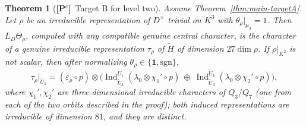 \documentclass[11pt]{article}
\newcommand{\Ind}{\operatorname{Ind}}
\newcommand{\tH}{\widetilde H}
\newcommand{\tU}{\widetilde U}
\newcommand{\Pctag}{\textnormal{\textbf{[P$^{\mathrm c}$]}}}
\theoremstyle{plain}
\newtheorem{theorem}{Theorem}[section]
\theoremstyle{definition}
\begin{document}
\begin{theorem}[\Pctag\ Target B for level two]\label{thm:leveltwo}
Assume Theorem~\ref{thm:main-targetA}.  Let $\rho$ be an irreducible
representation of $D^\times$ trivial on $K^3$ with $\theta_\rho|_{\mu_3}=1$.  Then $L_D\Theta_\rho$, computed
with any compatible genuine central character, is the character of a
genuine irreducible representation $\tau_\rho$ of $\tH$ of dimension
$27\dim\rho$.  If $\rho|_{K^2}$ is not scalar, then after normalizing
$\theta_\rho\in\{\mathbf1,\mathrm{sgn}\}$,
\[
 \tau_\rho|_{\tU_1}=(\varepsilon_\rho\circ p)\otimes\bigl(\Ind_{\tU_3}^{\tU_1}(\lambda_0\otimes\chi_1'\circ p)\ \oplus\ \Ind_{\tU_3}^{\tU_1}(\lambda_0\otimes\chi_2'\circ p)\bigr),
\]
where $\chi_1',\chi_2'$ are three-dimensional irreducible characters of
$Q_3/Q_7$ (one from each of the two orbits described in the proof); both
induced representations are irreducible of dimension $81$, and they are
distinct.
\end{theorem}
\end{document}
